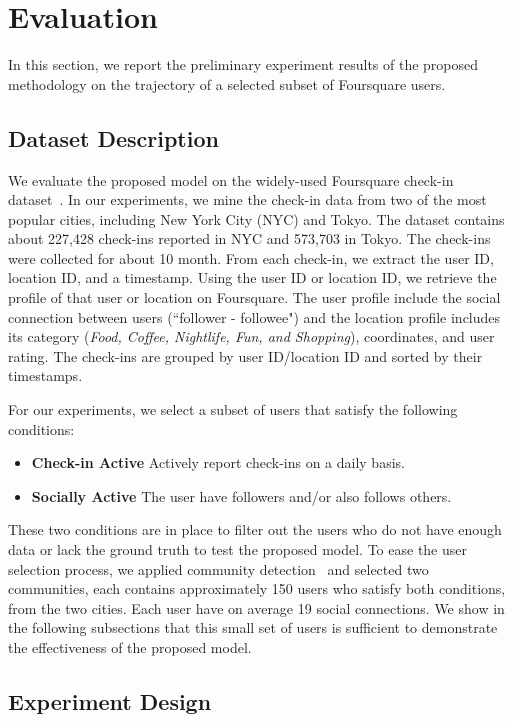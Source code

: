 \section{Evaluation} \label{sec:evaluation}

In this section, we report the preliminary experiment results of the proposed methodology on the trajectory of a selected subset of Foursquare users.

\subsection{Dataset Description}

We evaluate the proposed model on the widely-used Foursquare check-in dataset~\cite{yang2015nationtelescope}. In our experiments, we mine the check-in data from two of the most popular cities, including New York City (NYC) and Tokyo. The dataset contains about 227,428 check-ins reported in NYC and 573,703 in Tokyo. The check-ins were collected for about 10 month. From each check-in, we extract the user ID, location ID, and a timestamp. Using the user ID or location ID, we retrieve the profile of that user or location on Foursquare. The user profile include the social connection between users (``follower - followee") and the location profile includes its category (\textit{Food, Coffee, Nightlife, Fun, and Shopping}), coordinates, and user rating. The check-ins are grouped by user ID/location ID and sorted by their timestamps.

For our experiments, we select a subset of users that satisfy the following conditions:
\begin{itemize}
\item \textbf{Check-in Active} Actively report check-ins on a daily basis.
\item \textbf{Socially Active} The user have followers and/or also follows others.
\end{itemize}
These two conditions are in place to filter out the users who do not have enough data or lack the ground truth to test the proposed model. To ease the user selection process, we applied community detection~\cite{fortunato2010community} and selected two communities, each contains approximately 150 users who satisfy both conditions, from the two cities. Each user have on average 19 social connections. We show in the following subsections that this small set of users is sufficient to demonstrate the effectiveness of the proposed model.

\subsection{Experiment Design}

